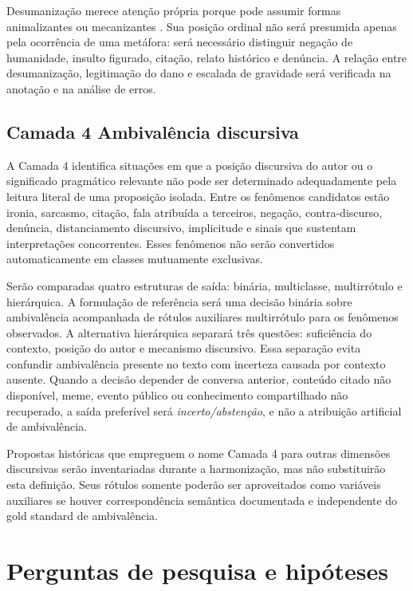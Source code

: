 Desumanização merece atenção própria porque pode assumir formas animalizantes ou mecanizantes \cite{haslam2006}. Sua posição ordinal não será presumida apenas pela ocorrência de uma metáfora: será necessário distinguir negação de humanidade, insulto figurado, citação, relato histórico e denúncia. A relação entre desumanização, legitimação do dano e escalada de gravidade será verificada na anotação e na análise de erros.

\subsection{Camada 4 Ambivalência discursiva}

A Camada 4 identifica situações em que a posição discursiva do autor ou o significado pragmático relevante não pode ser determinado adequadamente pela leitura literal de uma proposição isolada. Entre os fenômenos candidatos estão ironia, sarcasmo, citação, fala atribuída a terceiros, negação, contra-discurso, denúncia, distanciamento discursivo, implicitude e sinais que sustentam interpretações concorrentes. Esses fenômenos não serão convertidos automaticamente em classes mutuamente exclusivas.

Serão comparadas quatro estruturas de saída: binária, multiclasse, multirrótulo e hierárquica. A formulação de referência será uma decisão binária sobre ambivalência acompanhada de rótulos auxiliares multirrótulo para os fenômenos observados. A alternativa hierárquica separará três questões: suficiência do contexto, posição do autor e mecanismo discursivo. Essa separação evita confundir ambivalência presente no texto com incerteza causada por contexto ausente. Quando a decisão depender de conversa anterior, conteúdo citado não disponível, meme, evento público ou conhecimento compartilhado não recuperado, a saída preferível será \emph{incerto/abstenção}, e não a atribuição artificial de ambivalência.

Propostas históricas que empreguem o nome Camada 4 para outras dimensões discursivas serão inventariadas durante a harmonização, mas não substituirão esta definição. Seus rótulos somente poderão ser aproveitados como variáveis auxiliares se houver correspondência semântica documentada e independente do gold standard de ambivalência.

\section{Perguntas de pesquisa e hipóteses}
\label{sec:perguntas-hipoteses}

